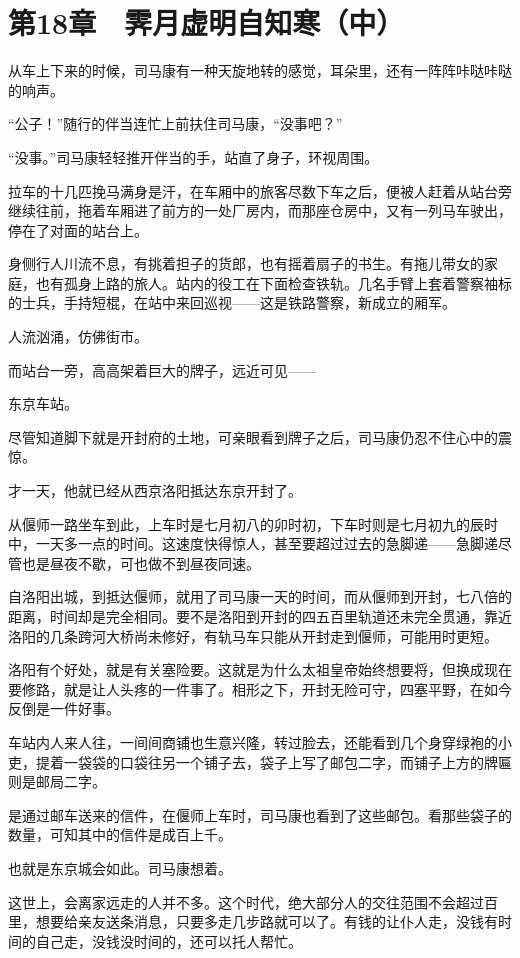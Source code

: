 \section{第18章　霁月虚明自知寒（中）}

从车上下来的时候，司马康有一种天旋地转的感觉，耳朵里，还有一阵阵咔哒咔哒的响声。

“公子！”随行的伴当连忙上前扶住司马康，“没事吧？”

“没事。”司马康轻轻推开伴当的手，站直了身子，环视周围。

拉车的十几匹挽马满身是汗，在车厢中的旅客尽数下车之后，便被人赶着从站台旁继续往前，拖着车厢进了前方的一处厂房内，而那座仓房中，又有一列马车驶出，停在了对面的站台上。

身侧行人川流不息，有挑着担子的货郎，也有摇着扇子的书生。有拖儿带女的家庭，也有孤身上路的旅人。站内的役工在下面检查铁轨。几名手臂上套着警察袖标的士兵，手持短棍，在站中来回巡视——这是铁路警察，新成立的厢军。

人流汹涌，仿佛街市。

而站台一旁，高高架着巨大的牌子，远近可见——

东京车站。

尽管知道脚下就是开封府的土地，可亲眼看到牌子之后，司马康仍忍不住心中的震惊。

才一天，他就已经从西京洛阳抵达东京开封了。

从偃师一路坐车到此，上车时是七月初八的卯时初，下车时则是七月初九的辰时中，一天多一点的时间。这速度快得惊人，甚至要超过过去的急脚递——急脚递尽管也是昼夜不歇，可也做不到昼夜同速。

自洛阳出城，到抵达偃师，就用了司马康一天的时间，而从偃师到开封，七八倍的距离，时间却是完全相同。要不是洛阳到开封的四五百里轨道还未完全贯通，靠近洛阳的几条跨河大桥尚未修好，有轨马车只能从开封走到偃师，可能用时更短。

洛阳有个好处，就是有关塞险要。这就是为什么太祖皇帝始终想要将，但换成现在要修路，就是让人头疼的一件事了。相形之下，开封无险可守，四塞平野，在如今反倒是一件好事。

车站内人来人往，一间间商铺也生意兴隆，转过脸去，还能看到几个身穿绿袍的小吏，提着一袋袋的口袋往另一个铺子去，袋子上写了邮包二字，而铺子上方的牌匾则是邮局二字。

是通过邮车送来的信件，在偃师上车时，司马康也看到了这些邮包。看那些袋子的数量，可知其中的信件是成百上千。

也就是东京城会如此。司马康想着。

这世上，会离家远走的人并不多。这个时代，绝大部分人的交往范围不会超过百里，想要给亲友送条消息，只要多走几步路就可以了。有钱的让仆人走，没钱有时间的自己走，没钱没时间的，还可以托人帮忙。

